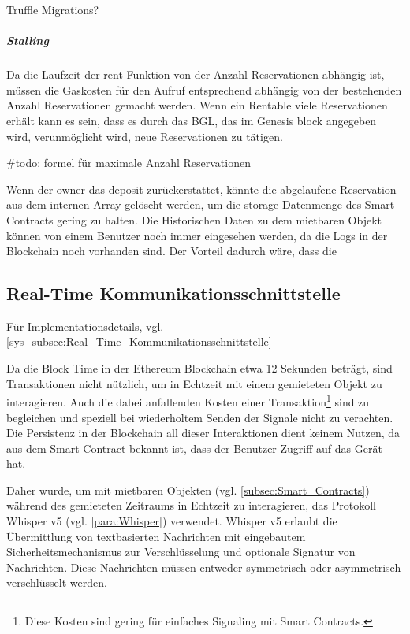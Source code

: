 Truffle Migrations?

\subparagraph{Stalling}
\label{subpara:Stalling}
Da die Laufzeit der rent Funktion von der Anzahl Reservationen abhängig ist, müssen die Gaskosten für den Aufruf entsprechend abhängig von der bestehenden Anzahl Reservationen gemacht werden. Wenn ein Rentable viele Reservationen erhält kann es sein, dass es durch das \acrfull{BGL}, das im Genesis block angegeben wird, verunmöglicht wird, neue Reservationen zu tätigen.\cite[Security Considerations/Gas Limit and Loops]{solidity.readthedocs.io}\cite{media.consensys.net/gas-and-fuel}

\#todo: formel für maximale Anzahl Reservationen

Wenn der owner das deposit zurückerstattet, könnte die abgelaufene Reservation aus dem internen Array gelöscht werden, um die storage Datenmenge des Smart Contracts gering zu halten. Die Historischen Daten zu dem mietbaren Objekt können von einem Benutzer noch immer eingesehen werden, da die Logs in der Blockchain noch vorhanden sind. Der Vorteil dadurch wäre, dass die 


\subsection{Real-Time Kommunikationsschnittstelle}
\label{subsec:Real_Time_Kommunikationsschnittstelle}
Für Implementationsdetails, vgl. \ref{sys_subsec:Real_Time_Kommunikationsschnittstelle}

Da die Block Time in der Ethereum Blockchain etwa 12 Sekunden beträgt, sind Transaktionen nicht nützlich, um in Echtzeit mit einem gemieteten Objekt zu interagieren. Auch die dabei anfallenden Kosten einer Transaktion\footnote{Diese Kosten sind gering für einfaches Signaling mit Smart Contracts.} sind zu begleichen und speziell bei wiederholtem Senden der Signale nicht zu verachten. Die Persistenz in der Blockchain all dieser Interaktionen dient keinem Nutzen, da aus dem Smart Contract bekannt ist, dass der Benutzer Zugriff auf das Gerät hat. \cite{blog.ethereum.org/block-time}

Daher wurde, um mit mietbaren Objekten (vgl. \ref{subsec:Smart_Contracts}) während des gemieteten Zeitraums in Echtzeit zu interagieren, das Protokoll Whisper v5 (vgl. \ref{para:Whisper}) verwendet. Whisper v5 erlaubt die Übermittlung von textbasierten Nachrichten mit eingebautem Sicherheitsmechanismus zur Verschlüsselung und optionale Signatur von Nachrichten. Diese Nachrichten müssen entweder symmetrisch oder asymmetrisch verschlüsselt werden.\cite[Wiki/Whisper Usage]{go-ethereum}


